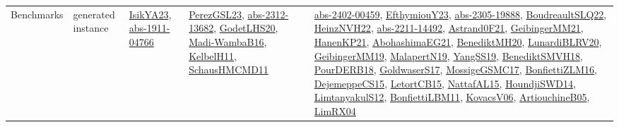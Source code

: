 {\begin{longtable}{lp{3cm}>{\raggedright}p{6cm}>{\raggedright}p{6cm}p{8cm}}
Benchmarks & generated instance & \href{articles/IsikYA23.pdf}{IsikYA23}\cite{IsikYA23}, \href{articles/abs-1911-04766.pdf}{abs-1911-04766}\cite{abs-1911-04766} & \href{papers/PerezGSL23.pdf}{PerezGSL23}\cite{PerezGSL23}, \href{articles/abs-2312-13682.pdf}{abs-2312-13682}\cite{abs-2312-13682}, \href{papers/GodetLHS20.pdf}{GodetLHS20}\cite{GodetLHS20}, \href{papers/Madi-WambaB16.pdf}{Madi-WambaB16}\cite{Madi-WambaB16}, \href{articles/KelbelH11.pdf}{KelbelH11}\cite{KelbelH11}, \href{articles/SchausHMCMD11.pdf}{SchausHMCMD11}\cite{SchausHMCMD11} & \href{articles/abs-2402-00459.pdf}{abs-2402-00459}\cite{abs-2402-00459}, \href{papers/EfthymiouY23.pdf}{EfthymiouY23}\cite{EfthymiouY23}, \href{articles/abs-2305-19888.pdf}{abs-2305-19888}\cite{abs-2305-19888}, \href{papers/BoudreaultSLQ22.pdf}{BoudreaultSLQ22}\cite{BoudreaultSLQ22}, \href{articles/HeinzNVH22.pdf}{HeinzNVH22}\cite{HeinzNVH22}, \href{articles/abs-2211-14492.pdf}{abs-2211-14492}\cite{abs-2211-14492}, \href{papers/Astrand0F21.pdf}{Astrand0F21}\cite{Astrand0F21}, \href{papers/GeibingerMM21.pdf}{GeibingerMM21}\cite{GeibingerMM21}, \href{papers/HanenKP21.pdf}{HanenKP21}\cite{HanenKP21}, \href{articles/AbohashimaEG21.pdf}{AbohashimaEG21}\cite{AbohashimaEG21}, \href{articles/BenediktMH20.pdf}{BenediktMH20}\cite{BenediktMH20}, \href{articles/LunardiBLRV20.pdf}{LunardiBLRV20}\cite{LunardiBLRV20}, \href{papers/GeibingerMM19.pdf}{GeibingerMM19}\cite{GeibingerMM19}, \href{papers/MalapertN19.pdf}{MalapertN19}\cite{MalapertN19}, \href{papers/YangSS19.pdf}{YangSS19}\cite{YangSS19}, \href{papers/BenediktSMVH18.pdf}{BenediktSMVH18}\cite{BenediktSMVH18}, \href{articles/PourDERB18.pdf}{PourDERB18}\cite{PourDERB18}, \href{papers/GoldwaserS17.pdf}{GoldwaserS17}\cite{GoldwaserS17}, \href{papers/MossigeGSMC17.pdf}{MossigeGSMC17}\cite{MossigeGSMC17}, \href{papers/BonfiettiZLM16.pdf}{BonfiettiZLM16}\cite{BonfiettiZLM16}, \href{papers/DejemeppeCS15.pdf}{DejemeppeCS15}\cite{DejemeppeCS15}, \href{articles/LetortCB15.pdf}{LetortCB15}\cite{LetortCB15}, \href{articles/NattafAL15.pdf}{NattafAL15}\cite{NattafAL15}, \href{papers/HoundjiSWD14.pdf}{HoundjiSWD14}\cite{HoundjiSWD14}, \href{articles/LimtanyakulS12.pdf}{LimtanyakulS12}\cite{LimtanyakulS12}, \href{papers/BonfiettiLBM11.pdf}{BonfiettiLBM11}\cite{BonfiettiLBM11}, \href{papers/KovacsV06.pdf}{KovacsV06}\cite{KovacsV06}, \href{papers/ArtiouchineB05.pdf}{ArtiouchineB05}\cite{ArtiouchineB05}, \href{papers/LimRX04.pdf}{LimRX04}\cite{LimRX04}\\

\end{longtable}}
